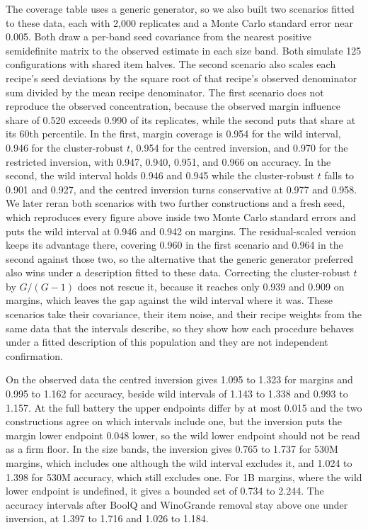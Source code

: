 The coverage table uses a generic generator, so we also built two scenarios fitted to these data, each with 2,000 replicates and a Monte Carlo standard error near 0.005. Both draw a per-band seed covariance from the nearest positive semidefinite matrix to the observed estimate in each size band. Both simulate 125 configurations with shared item halves. The second scenario also scales each recipe's seed deviations by the square root of that recipe's observed denominator sum divided by the mean recipe denominator. The first scenario does not reproduce the observed concentration, because the observed margin influence share of 0.520 exceeds 0.990 of its replicates, while the second puts that share at its 60th percentile. In the first, margin coverage is 0.954 for the wild interval, 0.946 for the cluster-robust $t$, 0.954 for the centred inversion, and 0.970 for the restricted inversion, with 0.947, 0.940, 0.951, and 0.966 on accuracy. In the second, the wild interval holds 0.946 and 0.945 while the cluster-robust $t$ falls to 0.901 and 0.927, and the centred inversion turns conservative at 0.977 and 0.958. We later reran both scenarios with two further constructions and a fresh seed, which reproduces every figure above inside two Monte Carlo standard errors and puts the wild interval at 0.946 and 0.942 on margins. The residual-scaled version keeps its advantage there, covering 0.960 in the first scenario and 0.964 in the second against those two, so the alternative that the generic generator preferred also wins under a description fitted to these data. Correcting the cluster-robust $t$ by $G/(G-1)$ does not rescue it, because it reaches only 0.939 and 0.909 on margins, which leaves the gap against the wild interval where it was. These scenarios take their covariance, their item noise, and their recipe weights from the same data that the intervals describe, so they show how each procedure behaves under a fitted description of this population and they are not independent confirmation.

On the observed data the centred inversion gives 1.095 to 1.323 for margins and 0.995 to 1.162 for accuracy, beside wild intervals of 1.143 to 1.338 and 0.993 to 1.157. At the full battery the upper endpoints differ by at most 0.015 and the two constructions agree on which intervals include one, but the inversion puts the margin lower endpoint 0.048 lower, so the wild lower endpoint should not be read as a firm floor. In the size bands, the inversion gives 0.765 to 1.737 for 530M margins, which includes one although the wild interval excludes it, and 1.024 to 1.398 for 530M accuracy, which still excludes one. For 1B margins, where the wild lower endpoint is undefined, it gives a bounded set of 0.734 to 2.244. The accuracy intervals after BoolQ and WinoGrande removal stay above one under inversion, at 1.397 to 1.716 and 1.026 to 1.184.

